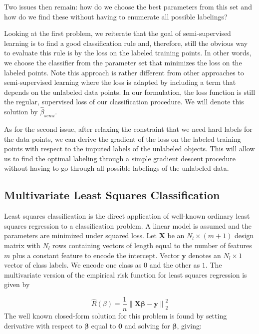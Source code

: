 \documentclass{elsarticle}
\begin{document}
Two issues then remain: how do we choose the best parameters from this set and how do we find these without having to enumerate all possible labelings?

Looking at the first problem, we reiterate that the goal of semi-supervised learning is to find a good classification rule and, therefore, still the obvious way to evaluate this rule is by the loss on the labeled training points. In other words, we choose the classifier from the parameter set that minimizes the loss on the labeled points. Note this approach is rather different from other approaches to semi-supervised learning where the loss is adapted by including a term that depends on the unlabeled data points. In our formulation, the loss function is still the regular, supervised loss of our classification procedure. We will denote this solution by $\hat{\beta}_{semi}$.

As for the second issue, after relaxing the constraint that we need hard labels for the data points, we can derive the gradient of the loss on the labeled training points with respect to the imputed labels of the unlabeled objects. This will allow us to find the optimal labeling through a simple gradient descent procedure without having to go through all possible labelings of the unlabeled data. 

\subsection{Multivariate Least Squares Classification} \label{section:leastsquares}

Least squares classification \cite{Hastie2001,Rifkin2003} is the direct application of well-known ordinary least squares regression to a classification problem. A linear model is assumed and the parameters are minimized under squared loss. Let $\mathbf{X}$ be an $N_l \times (m+1)$ design matrix with $N_l$ rows containing vectors of length equal to the number of features $m$ plus a constant feature to encode the intercept. Vector $\textbf{y}$ denotes an $N_l \times 1$ vector of  class labels. We encode one class as $0$ and the other as $1$.  The multivariate version of the empirical risk function for least squares regression is given by

\begin{equation} \label{squaredloss}
\hat{R}(\beta) = \frac{1}{n} \left\|  \mathbf{X} \boldsymbol{\beta}-\mathbf{y} \right\| _2^2
\end{equation}
The well known closed-form solution for this problem is found by setting derivative with respect to $\boldsymbol{\beta}$ equal to $\textbf{0}$ and solving for $\boldsymbol{\beta}$, giving:
\end{document}
